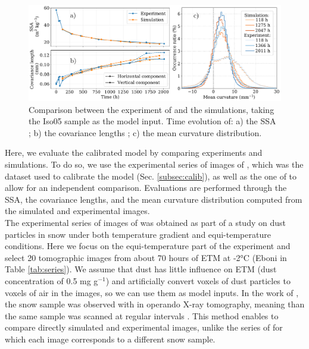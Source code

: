 \documentclass[draft,ms]{agujournal2019}
\begin{document}
\begin{figure}
    \centering
    \includegraphics[width=\linewidth]{Figures/microstruct_isoFlin_exp_simu.pdf}
    \caption{Comparison between the experiment of \protect{} and the simulations, taking the Iso05 sample as the model input. Time evolution of: a) the SSA ; b) the covariance lengths ; c) the mean curvature distribution.}
    \label{fig:flin_evaluation}
\end{figure}

Here, we evaluate the calibrated model by comparing experiments and simulations. To do so, we use the experimental series of images of , which was the dataset used to calibrate the model (Sec. \ref{subsec:calib}), as well as the one of  to allow for an independent comparison. Evaluations are performed through the SSA, the covariance lengths, and the mean curvature distribution computed from the simulated and experimental images.\\

 The experimental series of images of  was obtained as part of a study on dust particles in snow under both temperature gradient and equi-temperature conditions.
 Here we focus on the equi-temperature part of the experiment and select 20 tomographic images from about 70 hours of ETM at -2°C (Eboni in Table \ref{tab:series}). We assume that dust has little influence on ETM (dust concentration of 0.5 mg g$^{-1}$) and artificially convert voxels of dust particles to voxels of air in the images, so we can use them as model inputs. In the work of , the snow sample was observed with in operando X-ray tomography, meaning than the same sample was scanned at regular intervals \cite{calonne2015celldym}. This method enables to compare directly simulated and experimental images, unlike the series of  for which each image corresponds to a different snow sample.\\
\end{document}
